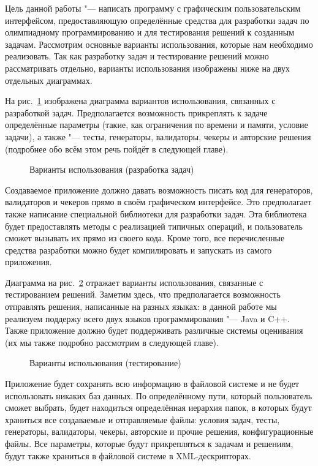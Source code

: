 Цель данной работы "--- написать программу с графическим пользовательским интерфейсом, предоставляющую определённые средства для разработки задач по олимпиадному программированию и для тестирования решений к созданным задачам. Рассмотрим основные варианты использования, которые нам необходимо реализовать. Так как разработку задач и тестирование решений можно рассматривать отдельно, варианты использования изображены ниже на двух отдельных диаграммах.

На рис.~\ref{use_case_diagram_development} изображена диаграмма вариантов использования, связанных с разработкой задач. Предполагается возможность прикреплять к задаче определённые параметры (такие, как ограничения по времени и памяти, условие задачи), а также "--- тесты, генераторы, валидаторы, чекеры и авторские решения (подробнее обо всём этом речь пойдёт в следующей главе).

\begin{figure}[h]
\caption{Варианты использования (разработка задач)}
\label{use_case_diagram_development}
\end{figure}

Создаваемое приложение должно давать возможность писать код для генераторов, валидаторов и чекеров прямо в своём графическом интерфейсе. Это предполагает также написание специальной библиотеки для разработки задач. Эта библиотека будет предоставлять методы с реализацией типичных операций, и пользователь сможет вызывать их прямо из своего кода. Кроме того, все перечисленные средства разработки можно будет компилировать и запускать из самого приложения.

Диаграмма на рис.~\ref{use_case_diagram_testing} отражает варианты использования, связанные с тестированием решений. Заметим здесь, что предполагается возможность отправлять решения, написанные на разных языках: в данной работе мы реализуем поддержу всего двух языков программирования "--- Java и C++. Также приложение должно будет поддерживать различные системы оценивания (их мы также подробно рассмотрим в следующей главе).

\begin{figure}[h]
\caption{Варианты использования (тестирование)}
\label{use_case_diagram_testing}
\end{figure}

Приложение будет сохранять всю информацию в файловой системе и не будет использовать никаких баз данных. По определённому пути, который пользователь сможет выбрать, будет находиться определённая иерархия папок, в которых будут храниться все создаваемые и отправляемые файлы: условия задач, тесты, генераторы, валидаторы, чекеры, авторские и прочие решения, конфигурационные файлы. Все параметры, которые будут прикрепляться к задачам и решениям, будут также храниться в файловой системе в XML-дескрипторах.